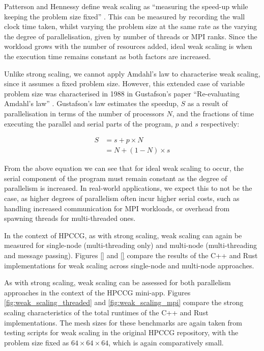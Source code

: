 Patterson and Hennessy define weak scaling as ``measuring the speed-up while keeping the problem size fixed'' \cite{pattersonHennessyComputerOrganisationArchitecture}. This can be measured by recording the wall clock time taken, whilst varying the problem size at the same rate as the varying the degree of parallelisation, given by number of threads or MPI ranks. Since the workload grows with the number of resources added, ideal weak scaling is when the execution time remains constant as both factors are increased.

Unlike strong scaling, we cannot apply Amdahl's law to characterise weak scaling, since it assumes a fixed problem size. However, this extended case of variable problem size was characterised in 1988 in Gustafson's paper ``Re-evaluating Amdahl's law'' \cite{gustafsonReevaluatingAmdahlLaw1988}. Gustafson's law estimates the speedup, $S$ as a result of parallelisation in terms of the number of processors $N$, and the fractions of time executing the parallel and serial parts of the program, $p$ and $s$ respectively:

\begin{align}
    S &= s + p \times N \\
      &= N + (1 - N) \times s
\end{align}

From the above equation we can see that for ideal weak scaling to occur, the serial component of the program must remain constant as the degree of parallelism is increased. In real-world applications, we expect this to not be the case, as higher degrees of parallelism often incur higher serial costs, such as handling increased communication for MPI workloads, or overhead from spawning threads for multi-threaded ones.

In the context of HPCCG, as with strong scaling, weak scaling can again be measured for single-node (multi-threading only) and multi-node (multi-threading and message passing). Figures \ref{} and \ref{} compare the results of the C++ and Rust implementations for weak scaling across single-node and multi-node approaches.

As with strong scaling, weak scaling can be assessed for both parallelism approaches in the context of the HPCCG mini-app. Figures \ref{fig:weak_scaling_threaded} and \ref{fig:weak_scaling_mpi} compare the strong scaling characteristics of the total runtimes of the C++ and Rust implementations. The mesh sizes for these benchmarks are again taken from testing scripts for weak scaling in the original HPCCG repository, with the problem size fixed as $64 \times 64 \times 64$, which is again comparatively small.

